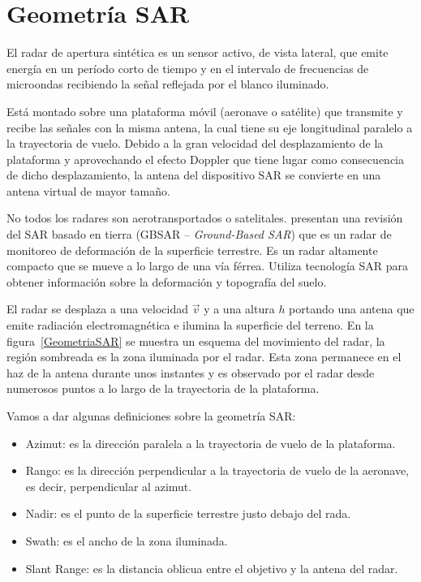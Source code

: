 \section{Geometría SAR}

El radar de apertura sintética es un sensor activo, de vista lateral, que emite energía en un período corto de tiempo y en el  intervalo  de  frecuencias  de  microondas recibiendo la señal reflejada por el blanco iluminado. 

Está montado sobre una plataforma móvil (aeronave o satélite) que transmite y recibe las señales con la misma antena, la cual tiene su eje longitudinal paralelo a la trayectoria de vuelo. 
Debido a la gran velocidad del desplazamiento de la plataforma y aprovechando el efecto Doppler que tiene lugar como consecuencia de dicho desplazamiento, la antena del dispositivo SAR  se convierte en una antena virtual de mayor tamaño. 

No todos los radares son aerotransportados o satelitales. 
\citet{Monserrat2014} presentan una revisión del SAR basado en tierra (GBSAR -- \textit{Ground-Based SAR}) que es un radar de monitoreo de deformación de la superficie terrestre. Es un radar altamente compacto que se mueve a lo largo de una vía férrea. Utiliza tecnología SAR para obtener información sobre la deformación y topografía del suelo.

El radar se desplaza a una velocidad $\vec{v}$ y a una altura $h$ portando una antena que emite radiación electromagnética e ilumina la superficie del terreno. En la figura~\ref{GeometriaSAR} se muestra un esquema del movimiento del radar, la región sombreada es la zona iluminada por el radar. Esta zona permanece en el haz de la antena durante unos instantes y es observado por el radar desde numerosos puntos a lo largo de la trayectoria de la plataforma.

Vamos a dar algunas definiciones sobre la geometría SAR:
\begin{itemize}
	\item Azimut: es la dirección paralela a la trayectoria de vuelo de la plataforma.
	\item Rango: es la dirección perpendicular a la trayectoria de vuelo de la aeronave, es decir, perpendicular al azimut.
	\item Nadir: es el punto de la superficie terrestre justo debajo del rada.
	\item Swath: es el ancho de la zona iluminada.
	\item Slant Range: es la distancia oblicua entre el objetivo y la antena del radar.
\end{itemize}


